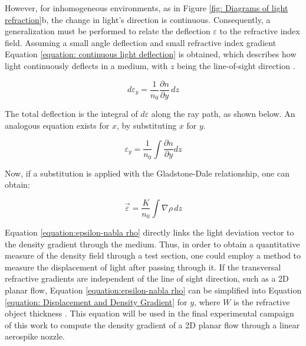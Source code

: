 \par However, for inhomogeneous environments, as in Figure \ref{fig: Diagrams of light refraction}b, the change in light's direction is continuous. Consequently, a generalization must be performed to relate the deflection $\varepsilon$ to the refractive index field. Assuming a small angle deflection and small refractive index gradient Equation \ref{equation: continuous light deflection} is obtained, which describes how light continuously deflects in a medium, with $z$ being the line-of-sight direction \cite{Settles2001}.

\begin{equation}
    \label{equation: continuous light deflection}
    d\varepsilon_y = \frac{1}{n_0}\frac{\partial n}{\partial y}\,dz
\end{equation}

\par The total deflection is the integral of $d\varepsilon$ along the ray path, as shown below. An analogous equation exists for $x$, by substituting $x$ for $y$.

\begin{equation}
\label{equation: displacement integral}
    \varepsilon_y
=
\frac{1}{n_0}
\int \frac{\partial n}{\partial y} dz
\end{equation}

\par Now, if a substitution is applied with the Gladstone-Dale relationship, one can obtain:

\begin{equation}
\label{equation:epsilon-nabla rho}
    \vec{\varepsilon}
=
\frac{K}{n_0}
\int \nabla \rho \, dz
\end{equation}

\par Equation \ref{equation:epsilon-nabla rho} directly links the light deviation vector to the density gradient through the medium. Thus, in order to obtain a quantitative measure of the density field through a test section, one could employ a method to measure the displacement of light after passing through it. If the transversal refractive gradients are independent of the line of sight direction, such as a 2D planar flow, Equation \ref{equation:epsilon-nabla rho} can be simplified into Equation \ref{equation: Displacement and Density Gradient} for $y$, where $W$ is the refractive object thickness \cite{RajendranDotTracking}. This equation will be used in the final experimental campaign of this work to compute the density gradient of a 2D planar flow through a linear aerospike nozzle.

